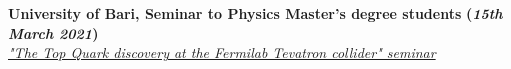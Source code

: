 \documentclass[11pt]{res}
\newcommand{\MarginText}[1]{\section{#1}\vspace{10pt}}
\begin{document}
\begin{resume}



\textbf{University of Bari, Seminar to Physics Master's degree students} \textbf{(\textit{15th March 2021})}\\ 
\href{https://recascloud.ba.infn.it/index.php/s/ItcCFRRq3gKGuXx}{\textit{"The Top Quark discovery at the Fermilab Tevatron collider" seminar}} %


											    








\end{resume}
\end{document}
